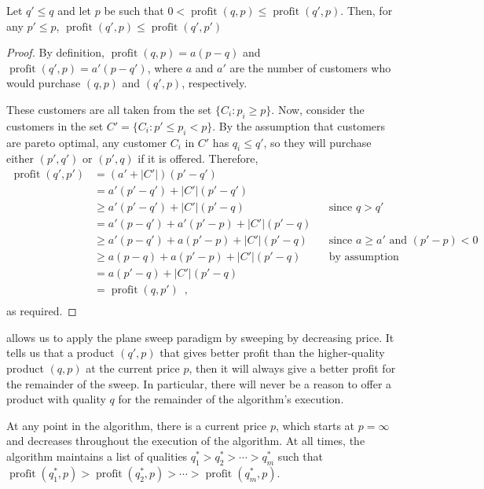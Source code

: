 \documentclass[lotsofwhite]{patmorin}
\newcommand{\val}{\operatorname{profit}}
\begin{document}
\begin{lem}
Let $q' \le q$ and let $p$ be such that $0 < \val(q,p) \le \val(q',p)$.
Then, for any $p' \le p$, $\val(q',p) \le \val(q',p')$
\end{lem}

\begin{proof}
By definition, $\val(q,p) = a(p-q)$ and $\val(q',p) = a'(p-q')$, where
$a$ and $a'$ are the number of customers who would purchase $(q,p)$
and $(q',p)$, respectively.

These customers are all taken from the set $\{C_i: p_i \ge p\}$.  Now,
consider the customers in the set $C'=\{C_i: p' \le p_i < p\}$.  By
the assumption that customers are pareto optimal, any customer $C_i$
in $C'$ has $q_i \le q'$, so they will purchase either $(p',q')$ or
$(p',q)$ if it is offered.  Therefore, 
\[
  \begin{aligned}
    \val(q',p')
      &  =   (a'+|C'|)(p'-q') \\
      &  =   a'(p'-q') + |C'|(p'-q') \\
      & \ge  a'(p'-q') + |C'|(p'-q) 
        && \mbox{since $q > q'$} \\
      &  =   a'(p-q') + a'(p'-p) + |C'|(p'-q) \\
      & \ge  a'(p-q') + a(p'-p) + |C'|(p'-q) 
        && \mbox{since $a \ge a'$ and $(p'-p) < 0$} \\
      & \ge  a(p-q) + a(p'-p) + |C'|(p'-q) 
        && \mbox{by assumption} \\
      &  =  a(p'-q) + |C'|(p'-q) \\
      &  =  \val(q,p') \enspace , \\
  \end{aligned}
\]
as required.
\end{proof}

 allows us to apply the plane sweep paradigm by
sweeping by decreasing price.  It tells us that a product $(q',p)$
that gives better profit than the higher-quality product $(q,p)$ at
the current price $p$, then it will always give a better profit for
the remainder of the sweep.  In particular, there will never be a
reason to offer a product with quality $q$ for the remainder of the
algorithm's execution.

At any point in the algorithm, there is a current price $p$, which
starts at $p=\infty$ and decreases throughout the execution of the
algorithm.  At all times, the algorithm maintains a list of qualities
$q_1^* > q_2^* > \cdots > q_m^*$ such that $\val(q_1^*,p) >
\val(q_2^*,p) >\cdots>\val(q_m^*,p)$.
\end{document}
